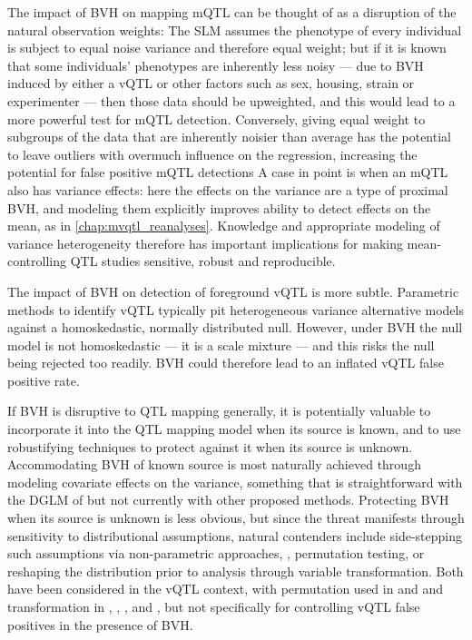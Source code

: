 The impact of BVH on mapping mQTL can be thought of as a disruption of the natural observation weights: The SLM assumes the phenotype of every individual is subject to equal noise variance and therefore equal weight; but if it is known that some individuals' phenotypes are inherently less noisy --- due to BVH induced by either a vQTL or other factors such as sex, housing, strain or experimenter --- then those data should be upweighted, and this would lead to a more powerful test for mQTL detection.
Conversely, giving equal weight to subgroups of the data that are inherently noisier than average has the potential to leave outliers with overmuch influence on the regression, increasing the potential for false positive mQTL detections
A case in point is when an mQTL also has variance effects: here the effects on the variance are a type of proximal BVH, and modeling them explicitly improves ability to detect effects on the mean, as in \autoref{chap:mvqtl_reanalyses}.
Knowledge and appropriate modeling of variance heterogeneity therefore has important implications for making mean-controlling QTL studies sensitive, robust and reproducible.

The impact of BVH on detection of foreground vQTL is more subtle. Parametric methods to identify vQTL typically pit heterogeneous variance alternative models against a homoskedastic, normally distributed null.
However, under BVH the null model is not homoskedastic --- it is a scale mixture --- and this risks the null being rejected too readily.
BVH could therefore lead to an inflated vQTL false positive rate.

If BVH is disruptive to QTL mapping generally, it is potentially valuable to incorporate it into the QTL mapping model when its source is known, and to use robustifying techniques to protect against it when its source is unknown.
Accommodating BVH of known source is most naturally achieved through modeling covariate effects on the variance, something that is straightforward with the DGLM of \cite{Ronnegard2011a} but not currently with other proposed methods. 
Protecting BVH when its source is unknown is less obvious, but since the threat manifests through sensitivity to distributional assumptions, natural contenders include side-stepping such assumptions via non-parametric approaches, \eg, permutation testing, or reshaping the distribution prior to analysis through variable transformation.
Both have been considered in the vQTL context, with permutation used in \cite{Hulse2013} and \cite{Yang2012} and transformation in \cite{Ronnegard2011a}, \cite{Yang2012}, \cite{Sun2013a}, and \cite{Shen2013a}, but not specifically for controlling vQTL false positives in the presence of BVH.



